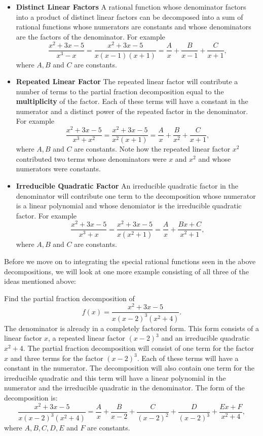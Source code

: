 \documentclass{ximera}
\begin{document}
\begin{itemize}

\item{\textbf{Distinct Linear Factors}} A rational function whose denominator factors into a product of distinct linear factors
can be decomposed into a sum of rational functions whose numerators are constants and whose denominators are the factors of the denominator.
For example 
\[
\frac{x^2 + 3x -5}{x^3 -x} = \frac{x^2 + 3x -5}{x(x-1)(x+1)} = \frac{A}{x} + \frac{B}{x-1} + \frac{C}{x+1},
\]
where $A, B$ and $C$ are constants.




\item{\textbf{Repeated Linear Factor}} The repeated linear factor will contribute a number of terms to the partial fraction 
decomposition equal to the \textbf{multiplicity} of the factor. Each of these terms will have a constant in the numerator and a 
distinct power of the repeated factor in the denominator.
For example 
\[
\frac{x^2 + 3x -5}{x^3 + x^2} = \frac{x^2 + 3x -5}{x^2(x+1)} = \frac{A}{x} + \frac{B}{x^2} + \frac{C}{x+1},
\]
where $A, B$ and $C$ are constants. Note how the repeated linear factor $x^2$ contributed two terms whose denominators were $x$ and $x^2$
and whose numerators were constants.


\item{\textbf{Irreducible Quadratic Factor}} An irreducible quadratic factor in the denominator will contribute one term to the decomposition whose numerator
is a linear polynomial and whose denomiator is the irreducible quadratic factor.
For example 
\[
\frac{x^2 + 3x -5}{x^3 +x} = \frac{x^2 + 3x -5}{x(x^2+1)} = \frac{A}{x} + \frac{Bx + C}{x^2 + 1},
\]
where $A, B$ and $C$ are constants.


\end{itemize}

Before we move on to integrating the special rational functions seen in the above decompositions, 
we will look at one more example consisting of all three of the ideas mentioned above:
 
\begin{example} %
Find the partial fraction decomposition of
\[
  f(x) = \frac{x^2 + 3x -5}{x(x-2)^3(x^2 + 4)}. 
\]
The denominator is already in a completely factored form.  This form consists of a linear factor $x$, 
a repeated linear factor $(x-2)^3$ and an irreducible quadratic $x^2 + 4$. 
The partial fraction decomposition will consist of one term for the factor $x$ and three terms for the factor
$(x-2)^3$.  Each of these terms will have a constant in the numerator.  
The decomposition will also contain one term for the irreducible quadratic and this term 
will have a linear polynomial in the numerator and the irreducible quadratic in the denominator.
The form of the decomposition is:
\[
  \frac{x^2 + 3x -5}{x(x-2)^3(x^2 + 4)} = \frac{A}{x} + \frac{B}{x-2} + \frac{C}{(x-2)^2} + \frac{D}{(x-2)^3} +\frac{Ex+F}{x^2+4},
\]
where $A, B, C, D, E$ and $F$ are constants.

\end{example}
\end{document}

